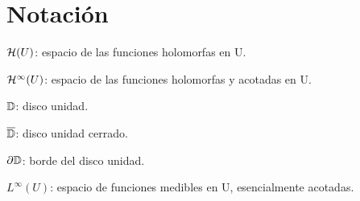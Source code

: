 \chapter{Notación}

$\mathcal{H}(U)$: espacio de las funciones holomorfas en U.

$\mathcal{H}^{\infty}(U)$: espacio de las funciones holomorfas y acotadas en U.

$\mathbb{D}$: disco unidad.

$\overline{\mathbb{D}}$: disco unidad cerrado.

$\partial \mathbb{D}$: borde del disco unidad.

$L^{\infty}(U)$: espacio de funciones medibles en U, esencialmente acotadas.
